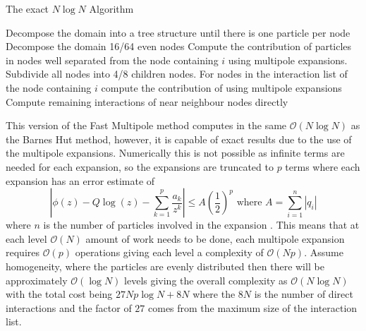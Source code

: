\begin{algorithm}
\caption{The exact $N \log N$ Algorithm}\label{alg:FMMNlogN}
\begin{algorithmic}
\State Decompose the domain into a tree structure until there is one particle per node
    \State Decompose the domain 16/64 even nodes
    \State Compute the contribution of particles in nodes well separated from the node
    \State \; containing $i$ using multipole expansions.
    \Repeat
        \State Subdivide all nodes into 4/8 children nodes.
        \State For nodes in the interaction list of the node containing $i$ compute the 
        \State \; contribution of using multipole expansions
    \State Compute remaining interactions of near neighbour nodes directly
\EndFor
\end{algorithmic}
\end{algorithm}

This version of the Fast Multipole method computes in the same $\mathcal{O}(N\log N)$ as the Barnes Hut method, however, it is capable of exact results due to the use of the multipole expansions. Numerically this is not possible as infinite terms are needed for each expansion, so the expansions are truncated to $p$ terms where each expansion has an error estimate of
\begin{equation*}
    \left|\phi(z)-Q \log (z)-\sum_{k=1}^{p} \frac{a_{k}}{z^{k}}\right| \leq A\left(\frac{1}{2}\right)^{p} \text{ where } A = \sum_{i=1}^{n} |q_i|
\end{equation*}
where $n$ is the number of particles involved in the expansion \cite{Beatson,Greengard1987ASimulations}. This means that at each level $\mathcal{O}(N)$ amount of work needs to be done, each multipole expansion requires $\mathcal{O}(p)$ operations giving each level a complexity of $\mathcal{O}(Np)$. Assume homogeneity, where the particles are evenly distributed then there will be approximately $\mathcal{O}(\log N)$ levels giving the overall complexity as $\mathcal{O}(N\log N)$ with the total cost being $27Np\log N + 8N$ where the $8N$ is the number of direct interactions and the factor of $27$ comes from the maximum size of the interaction list. 

